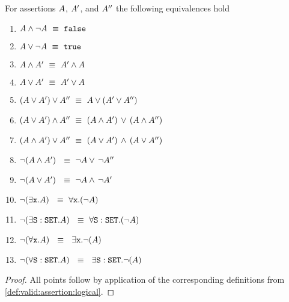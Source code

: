  \begin{lemma}
 \label{lemma:classic:two}
For     assertions $A$, $A'$, and $A''$ the following equivalences hold
\label{lemma:basic_assertions_classical}
\begin{enumerate}
\item
$ A \wedge\neg A \ \equiv \  {\mbox{\tt{false}}}$
\item
$ A \vee \neg A   \ \equiv \  {\mbox{\tt{true}}}$
\item
$ A \wedge A'  \ \equiv \  A' \wedge A$
\item
$ A \vee A'  \ \equiv \  A' \vee A$
\item
$(A \vee A') \vee A'' \ \equiv \  A \vee (A' \vee A'')$
\item
$(A \vee A') \wedge A'' \ \equiv \  (A \wedge A')\, \vee\, (A \wedge A'')$
\item
$(A \wedge A') \vee A'' \ \equiv \  (A \vee A')\, \wedge\, (A \vee A'')$
\item
$\neg (A \wedge A') \  \ \equiv \  \neg  A   \vee\, \neg A''$
\item
$\neg (A \vee A') \  \ \equiv \  \neg  A   \wedge\, \neg A'$
\item
$\neg (\exists \prg{x}.\A )  \  \ \equiv \  \forall \prg{x}.(\neg  \A)$
\item
$\neg (\exists {\mbox{\tt{S}}}:{\mbox{\tt{SET}}}.A )  \  \ \equiv \  \forall {\mbox{\tt{S}}}:{\mbox{\tt{SET}}}.(\neg  A)$
\item
$\neg (\forall \prg{x}. \A)  \  \ \equiv \  \  \exists \prg{x}.\neg(\A )$
\item
$\neg (\forall {\mbox{\tt{S}}}:{\mbox{\tt{SET}}}. A)  \  \ \equiv \  \  \exists {\mbox{\tt{S}}}:{\mbox{\tt{SET}}}.\neg(A )$
\end{enumerate}
\end{lemma}
\begin{proof}
All points follow by application of the corresponding definitions from \ref{def:valid:assertion:logical}. %
 \end{proof}

